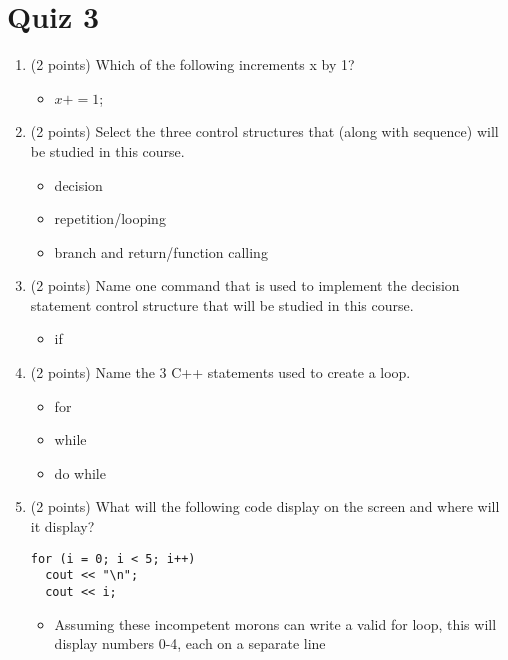 \documentclass{report}
\begin{document}
    \section{\LARGE Quiz 3}
    \bigbreak \noindent 
    \begin{enumerate}
    \item (2 points) Which of the following increments x by 1?
    \begin{itemize}
        \item \(x += 1\);
    \end{itemize}
    
    \item (2 points) Select the three control structures that (along with sequence) will be studied in this course.
    \begin{itemize}
        \item decision
        \item repetition/looping
        \item branch and return/function calling
    \end{itemize}
    
    \item (2 points) Name one command that is used to implement the decision statement control structure that will be studied in this course.
        \begin{itemize}
            \item if
        \end{itemize}
    
    \item (2 points) Name the 3 C++ statements used to create a loop.
        \begin{itemize}
            \item for 
            \item while
            \item do while
        \end{itemize}
    
    \item (2 points) What will the following code display on the screen and where will it display?
    \begin{verbatim}
for (i = 0; i < 5; i++)
  cout << "\n";
  cout << i;
    \end{verbatim}
    \begin{itemize}
        \item Assuming these incompetent morons can write a valid for loop, this will display numbers 0-4, each on a separate line
    \end{itemize}
    

\end{enumerate}
\end{document}
